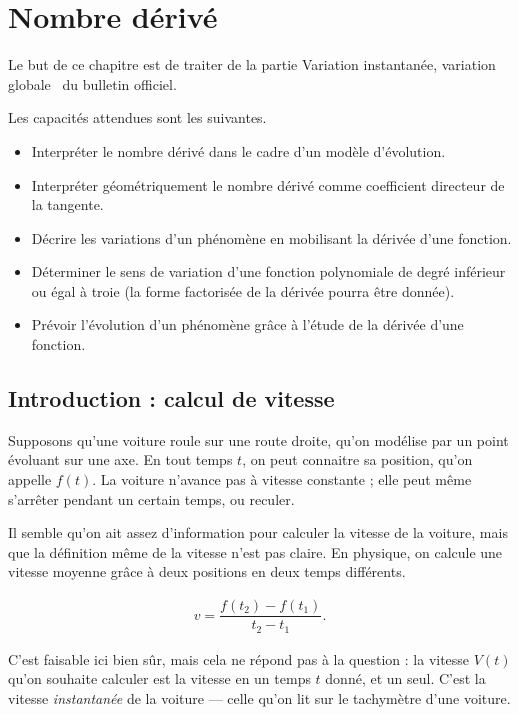 
\chapter{Nombre dérivé}

Le but de ce chapitre est de traiter de la partie \og Variation instantanée, variation globale \fg~du bulletin officiel.

Les capacités attendues sont les suivantes.
\begin{itemize}
	\item Interpréter le nombre dérivé dans le cadre d'un modèle d'évolution.
	\item Interpréter géométriquement le nombre dérivé comme coefficient directeur de la tangente.
	\item Décrire les variations d'un phénomène en mobilisant la dérivée d'une fonction.
	\item Déterminer le sens de variation d'une fonction polynomiale de degré inférieur ou égal à troie (la forme factorisée de la dérivée pourra être donnée).
	\item Prévoir l'évolution d'un phénomène grâce à l'étude de la dérivée d'une fonction.
\end{itemize}

\section{Introduction : calcul de vitesse}

Supposons qu'une voiture roule sur une route droite, qu'on modélise par un point évoluant sur une axe.
En tout temps $t$, on peut connaitre sa position, qu'on appelle $f(t)$.
La voiture n'avance pas à vitesse constante ;
elle peut même s'arrêter pendant un certain temps, ou reculer.


Il semble qu'on ait assez d'information pour calculer la vitesse de la voiture, mais que la définition même de la vitesse n'est pas claire.
En physique, on calcule une vitesse moyenne grâce à deux positions en deux temps différents.

	\begin{align}
		v = \dfrac{f(t_2) - f(t_1)}{t_2-t_1}. \label{eq:3.1}
	\end{align}

C'est faisable ici bien sûr, mais cela ne répond pas à la question : la vitesse $V(t)$ qu'on souhaite calculer est la vitesse en un temps $t$ donné, et un seul.
C'est la vitesse \emph{instantanée} de la voiture --- celle qu'on lit sur le tachymètre d'une voiture.


